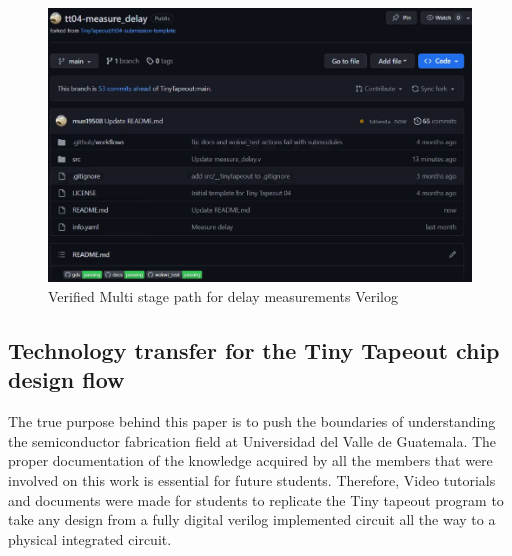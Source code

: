 \begin{figure}[H] 
    \centering
    \includegraphics[width=\linewidth]{Pictures/delay_ver.png}
    \caption{Verified Multi stage path for delay measurements Verilog}\label{fig:delay_verified}
\end{figure}

\subsection{Technology transfer for the Tiny Tapeout chip design flow}

The true purpose behind this paper is to push the boundaries of understanding the semiconductor fabrication field at Universidad del Valle de Guatemala. The proper documentation of the knowledge acquired by all the members that were involved on this work is essential for future students. Therefore, Video tutorials and documents were made for students to replicate the Tiny tapeout program to take any design from a fully digital verilog implemented circuit all the way to a physical integrated circuit. 

